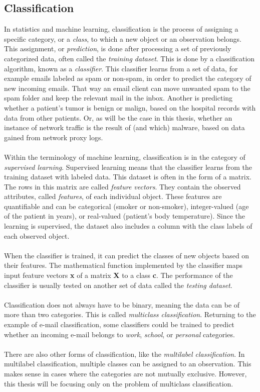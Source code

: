 \documentclass[11pt]{article}
\begin{document}
    \subsection{Classification}
      In statistics and machine learning, classification is the process of assigning a specific category, or a {\it class}, to which a new object or an observation belongs. This assignment, or {\it prediction}, is done after processing a set of previously categorized data, often called the {\it training dataset}. This is done by a classification algorithm, known as a {\it classifier}. This classifier learns from a set of data, for example emails labeled as spam or non-spam, in order to predict the category of new incoming emails. That way an email client can move unwanted spam to the spam folder and keep the relevant mail in the inbox. Another is predicting whether a patient's tumor is benign or malign, based on the hospital records with data from other patients. Or, as will be the case in this thesis, whether an instance of network traffic is the result of (and which) malware, based on data gained from network proxy logs.
      \\~\\
      Within the terminology of machine learning, classification is in the category of {\it supervised learning}. \cite{mlintro} Supervised learning means that the classifier learns from the training dataset with labeled data. This dataset is often in the form of a matrix. The rows in this matrix are called {\it feature vectors}. They contain the observed attributes, called {\it features}, of each individual object. These features are quantifiable and can be categorical (smoker or non-smoker), integer-valued (age of the patient in years), or real-valued (patient's body temperature). Since the learning is supervised, the dataset also includes a column with the class labels of each observed object.
      \\~\\
      When the classifier is trained, it can predict the classes of new objects based on their features. The mathematical function implemented by the classifier maps input feature vectors {\bf x} of a matrix {\bf X} to a class {\bf c}. The performance of the classifier is usually tested on another set of data called the {\it testing dataset}.
      \\~\\
      Classification does not always have to be binary, meaning the data can be of more than two categories. This is called {\it multiclass classification}. Returning to the example of e-mail classification, some classifiers could be trained to predict whether an incoming e-mail belongs to {\it work}, {\it school}, or {\it personal} categories.
      \\~\\
      There are also other forms of classification, like the {\it multilabel classification}. In multilabel classification, multiple classes can be assigned to an observation. This makes sense in cases where the categories are not mutually exclusive. However, this thesis will be focusing only on the problem of multiclass classification.
\end{document}

